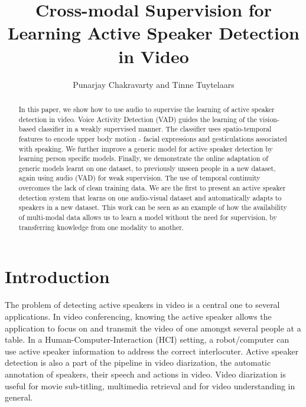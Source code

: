 \documentclass[runningheads]{llncs}
\begin{document}
\pagestyle{headings}
\mainmatter

\title{Cross-modal Supervision for Learning Active Speaker Detection in Video}




\author{Punarjay Chakravarty and Tinne Tuytelaars}


\maketitle

\begin{abstract}
In this paper, we show how to use audio to supervise the learning of active speaker detection in video. Voice Activity Detection (VAD) guides the learning of the vision-based classifier in a weakly supervised manner. The classifier uses spatio-temporal features to encode upper body motion - facial expressions and gesticulations associated with speaking. We further improve a generic model for active speaker detection by learning person specific models. Finally, we demonstrate the online adaptation of generic models learnt on one dataset, to previously unseen people in a new dataset, again using audio (VAD) for weak supervision. The use of temporal continuity overcomes the lack of clean training data. We are the first to present an %
active speaker detection system that learns on one audio-visual dataset and automatically adapts to speakers in a new dataset. This work can be seen as an example of how the availability of multi-modal data allows us to learn a model without the need for supervision, by transferring knowledge from one modality to another.
\end{abstract}


\section{Introduction}

The problem of detecting active speakers in video is a central one to several applications. In video conferencing, knowing the active speaker allows the application to focus on and transmit the video of one amongst several people at a table. In a Human-Computer-Interaction (HCI) setting, a robot/computer can use active speaker information to address the correct interlocuter. Active speaker detection is also a part of the pipeline in video diarization, the automatic annotation of speakers, their speech and actions in video. Video diarization is useful for movie sub-titling, multimedia retrieval and for video understanding in general.
\end{document}

